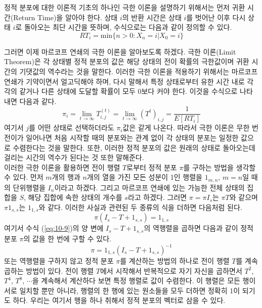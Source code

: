 \documentclass[a4paper]{oblivoir}
\begin{document}
정적 분포에 대한 이론적 기초의 하나인 극한 이론을 설명하기 위해서는 먼저 귀환 시간(Return Time)을 알아야 한다. 상태 $i$의 반환 시간은 상태 $i$를 벗어난 이후 다시 상태 $i$로 돌아오는 최단 시간을 뜻하며, 수식으로는 다음과 같이 정의할 수 있다.  
\begin{equation}
RT_{i} = \textrm{min} \{ n>0 : X_{n} = i | X_{0} = i \}
\label{eq:10-7}
\end{equation}

그러면 이제 마르코프 연쇄의 극한 이론을 알아보도록 하겠다. 극한 이론(Limit Theorem)은 각 상태별 정적 분포의 값은 해당 상태의 전이 확률의 극한값이며 귀환 시간의 기댓값의 역수라는 것을 말한다. 이러한 극한 이론을 적용하기 위해서는 마르코프 연쇄가 기약이면서 얼고딕해야 하며, 다시 말해서 특정 상태로부터 유한 시간 내로 각각의 같거나 다른 상태에 도달할 확률이 모두 0보다 커야 한다. 이것을 수식으로 나타내면 다음과 같다.
\begin{equation}
\pi_{i} = \lim_{t \rightarrow \infty} T_{i,j}^{(t)} = \lim_{t \rightarrow \infty} (T^{t})_{i,j} = \frac{1}{E[RT_{i}]}
\label{eq:10-8}
\end{equation}
여기서 $j$를 어떤 상태로 선택하더라도 $\pi_{i}$값은 같게 나온다. 따라서 극한 이론은 무한 번 전이가 일어나면 처음 시작할 때의 분포와는 관계 없이 각 상태의 분포는 일정한 값으로 수렴한다는 것을 말한다. 또한, 이러한 정적 분포의 값은 원래의 상태로 돌아오는데 걸리는 시간의 역수가 된다는 것 또한 말해준다. \\ 

이러한 극한 이론을 활용하면 전이 행렬 $T$로부터 정적 분포 $\pi$를 구하는 방법을 생각할 수 있다. 먼저 $m$개의 행과 $n$개의 열을 가진 모든 성분이 1인 행렬을 $1_{m,n}$, $m=n$일 때의 단위행렬을 $I_{n}$이라고 하겠다. 그리고 마르코프 연쇄에 있는 가능한 전체 상태의 집합을 $S$, 해당 집합에 속한 상태의 개수를 $s$라고 하겠다. 그러면 $\pi = \pi I_{s}$는 $\pi T$와 같으며 $\pi 1_{s,s}$는 $1_{1,s}$와 같다. 이러한 사실과 관련된 두 종류의 식을 더하면 다음처럼 된다. 
\begin{equation}
\pi(I_{s} - T + 1_{s,s}) = 1_{1,s}
\label{eq:10-9}
\end{equation}
여기서 수식 (\ref{eq:10-9})의 양 변에 $I_{s} - T + 1_{s,s}$의 역행렬을 곱하면 다음과 같이 정적 분포 $\pi$의 값을 한 번에 구할 수 있다. 
\begin{equation}
\pi = 1_{1,s} (I_{s} - T + 1_{s,s})^{-1}
\label{eq:10-9-1}
\end{equation}
또는 역행렬을 구하지 않고 정적 분포 $\pi$를 계산하는 방법의 하나로 전이 행렬 $T$를 계속 곱하는 방법이 있다. 전이 행렬 $T$에서 시작해서 반복적으로 자기 자신을 곱하면서 $T^{2}$, $T^{4}$, $T^{8}$, $\cdots$을 계속해서 계산하다 보면 특정 행렬로 값이 수렴한다. 이 행렬은 모든 행이 서로 일치할 뿐만 아니라, 행렬의 한 행에 있는 원소들을 모두 더하면 정확히 1이 되기도 하다. 우리는 여기서 행을 하나 취해서 정적 분포의 벡터로 삼을 수 있다. \\
\end{document}
